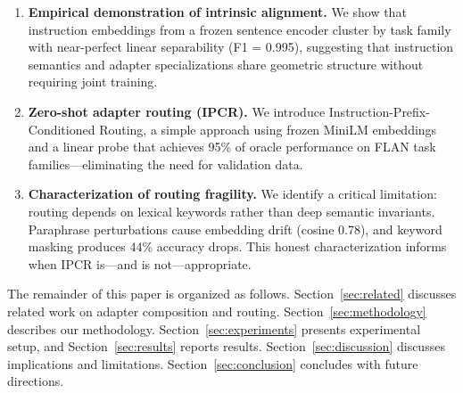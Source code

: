 \begin{enumerate}
    \item \textbf{Empirical demonstration of intrinsic alignment.} We show that instruction embeddings from a frozen sentence encoder cluster by task family with near-perfect linear separability (F1 = 0.995), suggesting that instruction semantics and adapter specializations share geometric structure without requiring joint training.

    \item \textbf{Zero-shot adapter routing (IPCR).} We introduce Instruction-Prefix-Conditioned Routing, a simple approach using frozen MiniLM embeddings and a linear probe that achieves 95\% of oracle performance on FLAN task families---eliminating the need for validation data.

    \item \textbf{Characterization of routing fragility.} We identify a critical limitation: routing depends on lexical keywords rather than deep semantic invariants. Paraphrase perturbations cause embedding drift (cosine 0.78), and keyword masking produces 44\% accuracy drops. This honest characterization informs when IPCR is---and is not---appropriate.
\end{enumerate}

The remainder of this paper is organized as follows. Section~\ref{sec:related} discusses related work on adapter composition and routing. Section~\ref{sec:methodology} describes our methodology. Section~\ref{sec:experiments} presents experimental setup, and Section~\ref{sec:results} reports results. Section~\ref{sec:discussion} discusses implications and limitations. Section~\ref{sec:conclusion} concludes with future directions.
